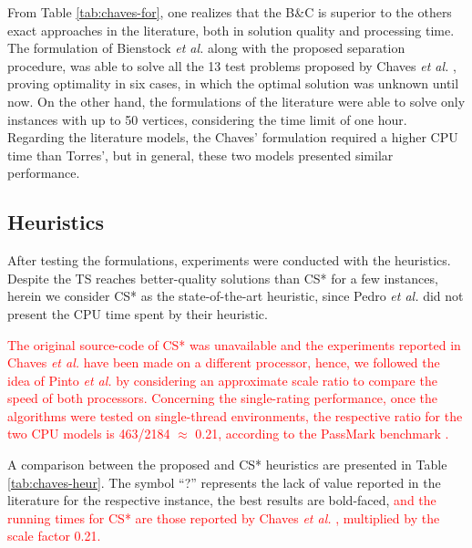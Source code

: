 \documentclass{ro}
\begin{document}
From Table \ref{tab:chaves-for}, one realizes that the B\&C is superior to the others exact approaches in the literature, both in solution quality and processing time. The formulation of Bienstock \textit{et al.} \cite{bienstock1993note} along with the proposed separation procedure, was able to solve all the 13 test problems proposed by Chaves \textit{et al.} \cite{chaves2005hybrid}, proving optimality in six cases, in which the optimal solution was unknown until now. On the other hand, the formulations of the literature were able to solve only instances with up to 50 vertices, considering the time limit of one hour. Regarding the literature models, the Chaves' formulation required a higher CPU time than Torres', but in general, these two models presented similar performance.



\subsection{Heuristics}

After testing the formulations, experiments were conducted with the heuristics. Despite the TS reaches better-quality solutions than CS* for a few instances, herein we consider CS* as the state-of-the-art heuristic, since Pedro \textit{et al.} \cite{pedro2013tabu} did not present the CPU time spent by their heuristic.




\textcolor{red}{The original source-code of CS* was unavailable and the experiments reported in Chaves \textit{et al.}\cite{chaves2005hybrid} have been made on a different processor, hence, we followed the idea of Pinto \textit{et al.} \cite{PINTO2018849} by considering an approximate scale ratio to compare the speed of both
processors. Concerning the single-rating performance, once the algorithms were tested on single-thread environments, the respective ratio for the two CPU models is 463/2184 $\approx$ 0.21, according to the PassMark benchmark \cite{passmark}.}

A comparison between the proposed and CS* heuristics are presented in Table  \ref{tab:chaves-heur}. The symbol ``?'' represents the lack of value reported in the literature for the respective instance,  the best results are bold-faced, \textcolor{red}{and the running times for CS* are those reported by Chaves \textit{et al.} \cite{chaves2005hybrid}, multiplied by the scale factor 0.21.}
\end{document}
